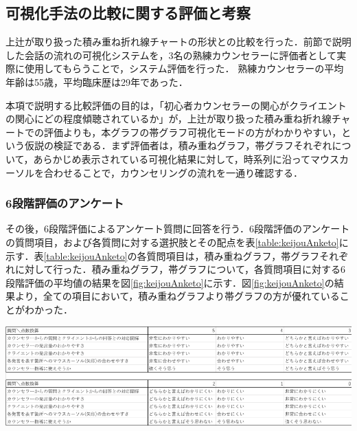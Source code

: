 \documentclass[shuuron]{kuee}
\begin{document}







\subsection{可視化手法の比較に関する評価と考察}
上辻\cite{uetsuji}が取り扱った積み重ね折れ線チャートの形状との比較を行った．前節で説明した会話の流れの可視化システムを，3名の熟練カウンセラーに評価者として実際に使用してもらうことで，システム評価を行った．
熟練カウンセラーの平均年齢は55歳，平均臨床歴は29年であった．

本項で説明する比較評価の目的は，「初心者カウンセラーの関心がクライエントの関心にどの程度傾聴されているか」が，上辻\cite{uetsuji}が取り扱った積み重ね折れ線チャートでの評価よりも，本グラフの帯グラフ可視化モードの方がわかりやすい，という仮説の検証である．まず評価者は，積み重ねグラフ，帯グラフそれぞれについて，あらかじめ表示されている可視化結果に対して，時系列に沿ってマウスカーソルを合わせることで，カウンセリングの流れを一通り確認する．

\subsubsection{6段階評価のアンケート}


その後，6段階評価によるアンケート質問に回答を行う．6段階評価のアンケートの質問項目，および各質問に対する選択肢とその配点を表\ref{table:keijouAnketo}に示す．表\ref{table:keijouAnketo}の各質問項目は，積み重ねグラフ，帯グラフそれぞれに対して行った．積み重ねグラフ，帯グラフについて，各質問項目に対する6段階評価の平均値の結果を図\ref{fig:keijouAnketo}に示す．図\ref{fig:keijouAnketo}の結果より，全ての項目において，積み重ねグラフより帯グラフの方が優れていることがわかった．

\begin{table}
  \caption{可視化手法比較アンケートにおける6段階評価質問}
  \label{table:keijouAnketo}
  \begin{center}
    \includegraphics[width=\linewidth]{point.png}
  \end{center}
\end{table}
\end{document}
